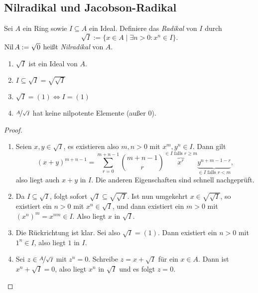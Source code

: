 \documentclass[12pt,a4paper]{scrartcl}
\theoremstyle{cplain}
\theoremstyle{cdef}
\begin{document}
\subsection{Nilradikal und Jacobson-Radikal}
\begin{defi}
    Sei $A$ ein Ring sowie $I\subseteq A$ ein Ideal. Definiere das \emph{Radikal} von $I$ durch \[\sqrt{I} := \{x\in A \mid \exists n>0: x^n\in I\}.\]
    $\operatorname{Nil} A := \sqrt{0}$ heißt \emph{Nilradikal} von $A$.
\end{defi}
\begin{lem}
    \leavevmode
    \begin{enumerate}
        \item $\sqrt{I}$ ist ein Ideal von $A$. \label{lem:radikal:i}
        \item $I\subseteq \sqrt{I} = \sqrt{\sqrt{I}}$ \label{lem:radikal:ii}
        \item $\sqrt{I} = (1) \Leftrightarrow I = (1)$ \label{lem:radikal:iii}
        \item $\nicefrac{A}{\sqrt{I}}$ hat keine nilpotente Elemente (außer 0). \label{lem:radikal:iv}
    \end{enumerate}
\end{lem}
\begin{proof}
	\leavevmode
	\begin{enumerate}[label=\ref{lem:radikal:\roman*}]
		\item Seien $x, y\in \sqrt{I}$, es existieren also $m, n > 0$ mit $x^m, y^n\in I$. Dann gilt
		\[(x+y)^{m+n-1}=\sum_{r=0}^{m+n-1}{m+n-1 \choose r}\overbrace{x^r}^{\in I \text{ falls } r\ge m}\underbrace{y^{n+m-1-r}}_{\in I \text{ falls } r<m},\]
		also liegt auch $x+y$ in $I$. Die anderen Eigenschaften sind schnell nachgeprüft.
		\item Da $I\subseteq \sqrt{I}$, folgt sofort $\sqrt{I} \subseteq \sqrt{\sqrt{I}}$. Ist nun umgekehrt $x\in \sqrt{\sqrt{I}}$, so existiert ein $n>0$ mit $x^n\in \sqrt{I}$, und dann existiert ein $m>0$ mit $(x^n)^m = x^{nm} \in I$. Also liegt $x$ in $\sqrt{I}$.
		\item Die Rückrichtung ist klar. Sei also $\sqrt I=(1)$. Dann existiert ein $n>0$ mit $1^n \in I$, also liegt $1$ in $I$.
		\item Sei $z\in \nicefrac{A}{\sqrt{I}}$ mit $z^n=0$. Schreibe $z=x+\sqrt{I}$ für ein $x\in A$. Dann ist $x^n+\sqrt{I} = 0$, also liegt $x^n$ in $\sqrt{I}$ und es folgt $z=0$.
		\qedhere
	\end{enumerate}
\end{proof}
\end{document}
